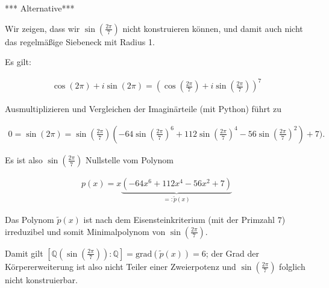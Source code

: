 \begin{solution}
  *** Alternative***

  Wir zeigen, dass wir $\sin(\frac{2 \pi }{7})$ nicht konstruieren können,
  und damit auch nicht das regelmäßige Siebeneck mit Radius 1.

  Es gilt:

  \begin{align*}
    \cos(2 \pi) + i \sin(2 \pi) = (\cos(\frac{2 \pi }{7}) + i \sin(\frac{2 \pi }{7}))^{7}
  \end{align*}

  Ausmultiplizieren und Vergleichen der Imaginärteile (mit Python) führt zu

  \begin{align*}
    0 = \sin(2 \pi) = \sin(\frac{2 \pi }{7}) (-64 \sin(\frac{2 \pi }{7})^{6} + 112 \sin(\frac{2 \pi }{7})^4 - 56 \sin(\frac{2 \pi }{7})^2) + 7).
  \end{align*}

  Es ist also $\sin(\frac{2 \pi }{7})$ Nullstelle vom Polynom

  \begin{align*}
    p(x) = x\underbrace{(-64x^6 + 112x^4 - 56x^2 + 7)}_{=:\tilde{p}(x)}
  \end{align*}

  Das Polynom $\tilde{p}(x)$ ist nach dem Eisensteinkriterium (mit der Primzahl $7$) irreduzibel und somit Minimalpolynom von $\sin(\frac{2 \pi }{7})$.

  Damit gilt $[\mathbb{Q}(\sin(\frac{2 \pi }{7})):\mathbb{Q}] = \mathrm{grad}(\tilde{p}(x)) = 6$; der Grad der Körpererweiterung ist also nicht Teiler einer Zweierpotenz und $\sin(\frac{2 \pi }{7})$ folglich nicht konstruierbar.

\end{solution}
